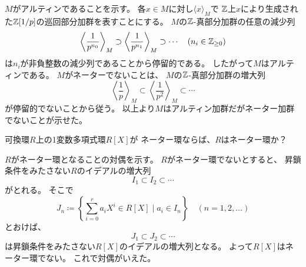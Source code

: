 \documentclass[report]{jlreq}
\begin{document}
\begin{answer}
    $M$がアルティンであることを示す。
    各$x \in M$に対し$\langle x \rangle_M$で
    $\mathbb{Z}$上$x$により生成された$\mathbb{Z}[1/p]$の巡回部分加群を表すことにする。
    $M$の$\mathbb{Z}$-真部分加群の任意の減少列
    \begin{equation}
        \left\langle \frac{1}{p^{n_0}} \right\rangle_M
            \supset \left\langle \frac{1}{p^{n_1}} \right\rangle_M
            \supset \cdots
            \quad
            (n_i \in \mathbb{Z}_{\ge 0})
    \end{equation}
    は$n_i$が非負整数の減少列であることから停留的である。
    したがって$M$はアルティンである。
    $M$がネーターでないことは、
    $M$の$\mathbb{Z}$-真部分加群の増大列
    \begin{equation}
        \left\langle \frac{1}{p} \right\rangle_M
            \subset \left\langle \frac{1}{p^2} \right\rangle_M
            \subset \cdots
    \end{equation}
    が停留的でないことから従う。
    以上より$M$はアルティン加群だがネーター加群でないことが示せた。
\end{answer}

\begin{problem}[代数学II 5.71]
    可換環$R$上の1変数多項式環$R[X]$が
    ネーター環ならば、$R$はネーター環か？
\end{problem}

\begin{answer}
    $R$がネーター環となることの対偶を示す。
    $R$がネーター環でないとすると、
    昇鎖条件をみたさない$R$のイデアルの増大列
    \begin{equation}
        I_1 \subset I_2 \subset \cdots
    \end{equation}
    がとれる。
    そこで
    \begin{equation}
        J_n \coloneqq \left\{
            \sum_{i = 0}^r a_i X^i \in R[X] \mid a_i \in I_n
        \right\}
        \quad (n = 1, 2, \dots)
    \end{equation}
    とおけば、
    \begin{equation}
        J_1 \subset J_2 \subset \cdots
    \end{equation}
    は昇鎖条件をみたさない$R[X]$のイデアルの増大列となる。
    よって$R[X]$はネーター環でない。
    これで対偶がいえた。
\end{answer}

\end{document}
